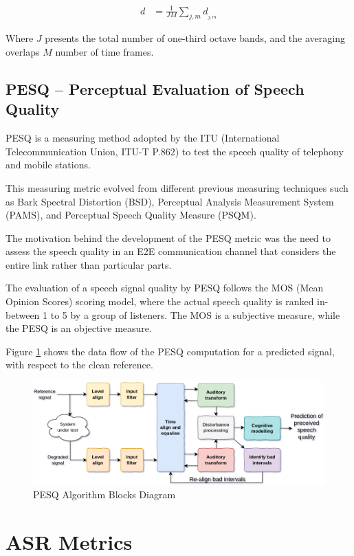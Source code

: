 \begin{align}\label{eq:stop_dist_avg}
    d & = \frac{1}{JM} \sum_{j,m} d_{_{j,m}}
\end{align}

Where \(J\) presents the total number of one-third octave bands,
and the averaging overlaps \(M\) number of time frames.

\subsection{PESQ -- Perceptual Evaluation of Speech Quality}
PESQ\cite{941023} is a measuring method adopted by 
the ITU (International Telecommunication Union, ITU-T P.862) to
test the speech quality of telephony and mobile stations.

This measuring metric evolved from different previous 
measuring techniques such as Bark Spectral Distortion (BSD),
Perceptual Analysis Measurement System (PAMS),
and Perceptual Speech Quality Measure (PSQM).

The motivation behind the development of the PESQ metric
was the need to assess the speech quality in an E2E
communication channel that considers 
the entire link rather than particular parts.

The evaluation of a speech signal quality by PESQ
follows the MOS (Mean Opinion Scores) scoring model, where
the actual speech quality is ranked in-between 1 to 5 
by a group of listeners. The MOS is a subjective measure,
while the PESQ is an objective measure.

Figure \ref{fig:pesq_blocks_diagram} shows the data flow
of the PESQ computation for a predicted signal, with respect to the
clean reference.

\begin{figure}[H]
    \centering
    \includegraphics[width=0.85\linewidth]{Features/images/pesq_blocks_diagram_new}
    \caption{PESQ Algorithm Blocks Diagram}\label{fig:pesq_blocks_diagram}
\end{figure}

\section{ASR Metrics}
